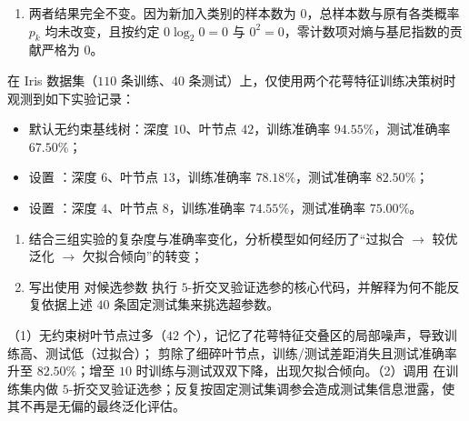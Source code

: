 \begin{exercise}[title={决策树节点分裂的熵增益与基尼增益手算},level=standard,points=15,tags={决策树,信息增益,基尼指数}]
\begin{solution}
\begin{enumerate}
\[\begin{aligned}
    \mathrm{Gini}_R &= 1 - \left(\frac{1}{46}\right)^2 - \left(\frac{45}{46}\right)^2 = \frac{2\times 1\times 45}{46^2} \approx 0.0425.
  \end{aligned}\]
  加权基尼指数与降低量为：
  \[
    \mathrm{Gini}_{\text{after}} = 0.54\times 0.1680 + 0.46\times 0.0425 \approx 0.1103,\qquad
    \Delta\mathrm{Gini} = 0.5000 - 0.1103 = 0.3897.
  \]
  \item 两者结果完全不变。因为新加入类别的样本数为 $0$，总样本数与原有各类概率 $p_k$ 均未改变，且按约定 $0\log_2 0 = 0$ 与 $0^2 = 0$，零计数项对熵与基尼指数的贡献严格为 $0$。
\end{enumerate}
\end{solution}
\end{exercise}

\begin{exercise}[title={Iris 决策树过拟合分析与模型选择规范},level=advanced,points=18,tags={决策树,过拟合,预剪枝,交叉验证}]
在 Iris 数据集（$110$ 条训练、$40$ 条测试）上，仅使用两个花萼特征训练决策树时观测到如下实验记录：
\begin{itemize}
  \item 默认无约束基线树：深度 $10$、叶节点 $42$，训练准确率 $94.55\%$，测试准确率 $67.50\%$；
  \item 设置 ：深度 $6$、叶节点 $13$，训练准确率 $78.18\%$，测试准确率 $82.50\%$；
  \item 设置 ：深度 $4$、叶节点 $8$，训练准确率 $74.55\%$，测试准确率 $75.00\%$。
\end{itemize}
\begin{enumerate}
  \item 结合三组实验的复杂度与准确率变化，分析模型如何经历了“过拟合 $\to$ 较优泛化 $\to$ 欠拟合倾向”的转变；
  \item 写出使用  对候选参数  执行 $5$-折交叉验证选参的核心代码，并解释为何不能反复依据上述 $40$ 条固定测试集来挑选超参数。
\end{enumerate}
\begin{answer}
（1）无约束树叶节点过多（$42$ 个），记忆了花萼特征交叠区的局部噪声，导致训练高、测试低（过拟合）； 剪除了细碎叶节点，训练/测试差距消失且测试准确率升至 $82.50\%$；增至 $10$ 时训练与测试双双下降，出现欠拟合倾向。（2）调用  在训练集内做 $5$-折交叉验证选参；反复按固定测试集调参会造成测试集信息泄露，使其不再是无偏的最终泛化评估。
\end{answer}
\begin{solution}

\end{solution}
\end{exercise}
